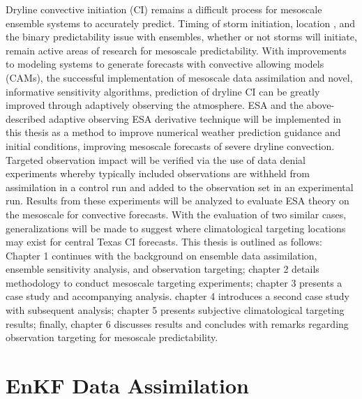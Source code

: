 \documentclass{ttuthes2007}
\newcommand{\tab}{\hspace*{2em}}  %
\begin{document}
\tab Dryline convective initiation (CI) remains a difficult process for mesoscale ensemble systems to accurately predict. Timing of storm initiation, location \citep{Cofferetal2013}, and the binary predictability issue with ensembles, whether or not storms will initiate, remain active areas of research for mesoscale predictability. With improvements to modeling systems to generate forecasts with convective allowing models (CAMs), the successful implementation of mesoscale data assimilation and novel, informative sensitivity algorithms, prediction of dryline CI can be greatly improved through adaptively observing the atmosphere. ESA and the above-described adaptive observing ESA derivative technique \citep{AncellandHakim2007a} will be implemented in this thesis as a method to improve numerical weather prediction guidance and initial conditions, improving mesoscale forecasts of severe dryline convection. Targeted observation impact will be verified via the use of data denial experiments whereby typically included observations are withheld from assimilation in a control run and added to the observation set in an experimental run. Results from these experiments will be analyzed to evaluate ESA theory on the mesoscale for convective forecasts. With the evaluation of two similar cases, generalizations will be made to suggest where climatological targeting locations may exist for central Texas CI forecasts. This thesis is outlined as follows: Chapter 1 continues with the background on ensemble data assimilation, ensemble sensitivity analysis, and observation targeting; chapter 2 details methodology to conduct mesoscale targeting experiments; chapter 3 presents a case study and accompanying analysis. chapter 4 introduces a second case study with subsequent analysis; chapter 5 presents subjective climatological targeting results; finally, chapter 6 discusses results and concludes with remarks regarding observation targeting for mesoscale predictability.

\section{EnKF Data Assimilation}
\end{document}
